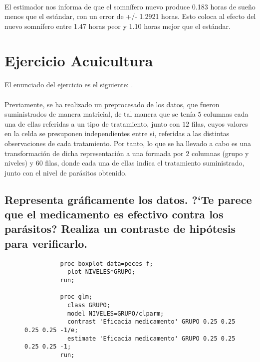 \documentclass{article}
\begin{document}
    \paragraph{}
    El estimador nos informa de que el somnífero nuevo produce 0.183 horas de sueño menos que el estándar, con un error de +/- 1.2921 horas. Esto coloca al efecto del nuevo somnífero entre 1.47 horas peor y 1.10 horas mejor que el estándar.

  \section{Ejercicio Acuicultura}

    \paragraph{}
    El enunciado del ejercicio es el siguiente: .

    \paragraph{}
    Previamente, se ha realizado un preprocesado de los datos, que fueron suministrados de manera matricial, de tal manera que se tenía $5$ columnas cada una de ellas referidas a un tipo de tratamiento, junto con $12$ filas, cuyos valores en la celda se presuponen independientes entre si, referidas a las distintas observaciones de cada tratamiento. Por tanto, lo que se ha llevado a cabo es una transformación de dicha representación a una formada por $2$ columnas (grupo y niveles) y $60$ filas, donde cada una de ellas indica el tratamiento suministrado, junto con el nivel de parásitos obtenido.

    \subsection{Representa gráficamente los datos. ?`Te parece que el medicamento es efectivo contra los parásitos? Realiza un contraste de hipótesis para verificarlo.}

      \begin{figure}[h]
        \centering
        \begin{verbatim}
          proc boxplot data=peces_f;
            plot NIVELES*GRUPO;
          run;

          proc glm;
            class GRUPO;
            model NIVELES=GRUPO/clparm;
            contrast 'Eficacia medicamento' GRUPO 0.25 0.25 0.25 0.25 -1/e;
            estimate 'Eficacia medicamento' GRUPO 0.25 0.25 0.25 0.25 -1;
          run;
        \end{verbatim}
        \label{code:sas_3}
      \end{figure}
\end{document}
